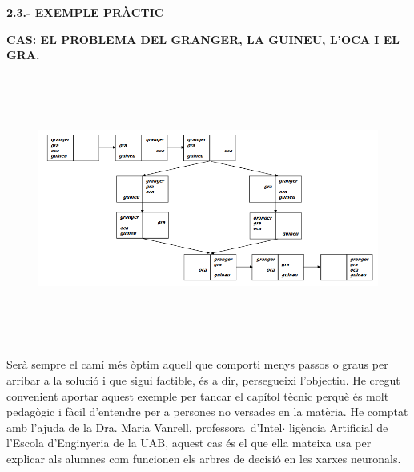 \documentclass[12pt]{article}
\begin{document}
\vspace{\baselineskip}
\textbf{2.3.- EXEMPLE PRÀCTIC}\par


\vspace{\baselineskip}
\begin{justify}
\textbf{CAS: EL PROBLEMA DEL GRANGER, LA GUINEU, L’OCA I EL GRA. }
\end{justify}\par




\begin{figure}[H]
\advance\leftskip -0.96in		\includegraphics[width=7.57in,height=3.48in]{./media/image4.png}
\end{figure}



\par


\vspace{\baselineskip}
\begin{justify}
Serà sempre el camí més òptim aquell que comporti menys passos o graus per arribar a la solució i que sigui factible, és a dir, persegueixi l’objectiu. He cregut convenient aportar aquest exemple per tancar el capítol tècnic perquè és molt pedagògic i fàcil d’entendre per a persones no versades en la matèria. He comptat amb l’ajuda de la Dra. Maria Vanrell, professora\ d’Intel$ \cdot $ ligència Artificial de l’Escola d’Enginyeria de la UAB,  aquest cas és el que ella mateixa usa per explicar als alumnes com funcionen els arbres de decisió en les xarxes neuronals.
\end{justify}\par
\end{document}
